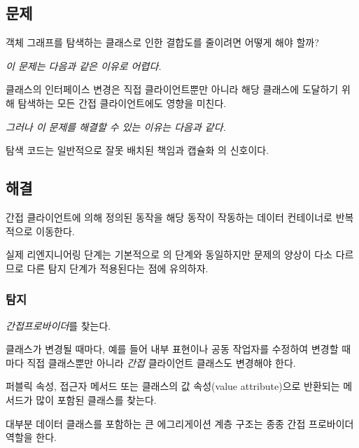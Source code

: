 \documentclass[a4paper,10pt,twoside]{book}
\begin{document}

\subsection*{문제}

객체 그래프를 탐색하는 클래스로 인한 결합도를 줄이려면 어떻게 해야 할까?

\emph{이 문제는 다음과 같은 이유로 어렵다.} 

\begin{bulletlist}
\item 클래스의 인터페이스 변경은 직접 클라이언트뿐만 아니라 해당 클래스에 도달하기 위해 탐색하는 모든 간접 클라이언트에도 영향을 미친다.
\end{bulletlist}

\emph{그러나 이 문제를 해결할 수 있는 이유는 다음과 같다.}

\begin{bulletlist}
\item 탐색 코드는 일반적으로 잘못 배치된 책임과 캡슐화 의 신호이다.
\end{bulletlist}

\subsection*{해결}

간접 클라이언트에 의해 정의된 동작을 해당 동작이 작동하는 데이터 컨테이너로 반복적으로 이동한다.

실제 리엔지니어링 단계는 기본적으로 의 단계와 동일하지만 문제의 양상이 다소 다르므로 다른 탐지 단계가 적용된다는 점에 유의하자.

\subsubsection*{탐지}

\emph{간접프로바이더}를 찾는다.

\begin{bulletlist}
\item 클래스가 변경될 때마다, 예를 들어 내부 표현이나 공동 작업자를 수정하여 변경할 때마다 직접 클래스뿐만 아니라 \emph{간접} 클라이언트 클래스도 변경해야 한다.

\item 퍼블릭 속성, 접근자 메서드 또는 클래스의 값 속성(value attribute)으로 반환되는 메서드가 많이 포함된 클래스를 찾는다.

\item 대부분 데이터 클래스를 포함하는 큰 에그리게이션 계층 구조는 종종 간접 프로바이더 역할을 한다.
\end{bulletlist}
\end{document}
